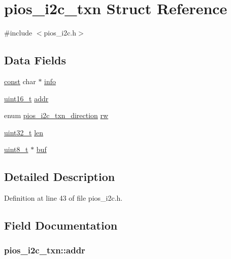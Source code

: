 \hypertarget{structpios__i2c__txn}{\section{pios\-\_\-i2c\-\_\-txn Struct Reference}
\label{structpios__i2c__txn}
}


{\ttfamily \#include $<$pios\-\_\-i2c.\-h$>$}

\subsection*{Data Fields}
\begin{DoxyCompactItemize}
\item 
\hyperlink{group___n_a_m_e_ga7ae6d0e43244213b34de2c2b9aa30da6}{const} char $\ast$ \hyperlink{structpios__i2c__txn_a202db3e74679d070f4f3d27c1dcb0f39}{info}
\item 
\hyperlink{stdint_8h_a273cf69d639a59973b6019625df33e30}{uint16\-\_\-t} \hyperlink{structpios__i2c__txn_a22a5ef8fef7182f36899d8410be0dc27}{addr}
\item 
enum \hyperlink{group___p_i_o_s___i2_c_ga317e7ea68e21f759a0326df96f278a2b}{pios\-\_\-i2c\-\_\-txn\-\_\-direction} \hyperlink{structpios__i2c__txn_a604f5e93b6ae3da9573915bc03bb1821}{rw}
\item 
\hyperlink{stdint_8h_a435d1572bf3f880d55459d9805097f62}{uint32\-\_\-t} \hyperlink{structpios__i2c__txn_af238133c1e4df913933e48fc29c5510b}{len}
\item 
\hyperlink{stdint_8h_aba7bc1797add20fe3efdf37ced1182c5}{uint8\-\_\-t} $\ast$ \hyperlink{structpios__i2c__txn_a0d544e19d0f73acb6bf43743bc5e1480}{buf}
\end{DoxyCompactItemize}


\subsection{Detailed Description}


Definition at line 43 of file pios\-\_\-i2c.\-h.



\subsection{Field Documentation}
\hypertarget{structpios__i2c__txn_a22a5ef8fef7182f36899d8410be0dc27}{
\subsubsection[{addr}]{ pios\-\_\-i2c\-\_\-txn\-::addr}}\label{structpios__i2c__txn_a22a5ef8fef7182f36899d8410be0dc27}


